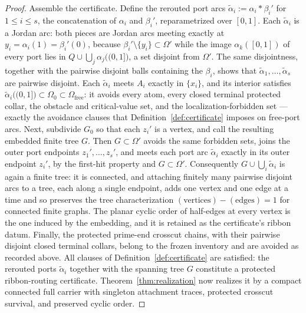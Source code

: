 \documentclass[11pt,reqno]{amsart}
\theoremstyle{definition}
\theoremstyle{remark}
\newcommand{\Omfree}{\Omega_{\mathrm{free}}}
\begin{document}
\begin{proof}
Assemble the certificate. Define the rerouted port arcs
$\tilde\alpha_i:=\alpha_i*\beta_i'$ for $1\le i\le s$, the concatenation of $\alpha_i$
and $\beta_i'$, reparametrized over $[0,1]$. Each $\tilde\alpha_i$ is a Jordan arc: both
pieces are Jordan arcs meeting exactly at $y_i=\alpha_i(1)=\beta_i'(0)$, because
$\beta_i'\setminus\{y_i\}\subset\Omega'$ while the image
$\alpha_k([0,1])$ of every port lies in
$Q\cup\bigcup_j\alpha_j\bigl((0,1]\bigr)$, a set disjoint from $\Omega'$. The same
disjointness, together with the pairwise disjoint balls containing the $\beta_i$, shows
that $\tilde\alpha_1,\dots,\tilde\alpha_s$ are pairwise disjoint. Each $\tilde\alpha_i$
meets $A_i$ exactly in $\{x_i\}$, and its interior satisfies
$\tilde\alpha_i\bigl((0,1]\bigr)\subset\Omega_0\subset\Omfree$: it avoids every atom,
every closed terminal protected collar, the obstacle and critical-value set, and the
localization-forbidden set --- exactly the avoidance clauses that
Definition~\ref{def:certificate} imposes on free-port arcs. Next, subdivide $G_0$ so
that each $z_i'$ is a vertex, and call the resulting embedded finite tree $G$. Then
$G\subset\Omega'$ avoids the same forbidden sets, joins the outer port endpoints
$z_1',\dots,z_s'$, and meets each port arc $\tilde\alpha_i$ exactly in its outer
endpoint $z_i'$, by the first-hit property and $G\subset\Omega'$. Consequently
$G\cup\bigcup_i\tilde\alpha_i$ is again a finite tree: it is connected, and attaching
finitely many pairwise disjoint arcs to a tree, each along a single endpoint, adds one
vertex and one edge at a time and so preserves the tree characterization
$(\text{vertices})-(\text{edges})=1$ for connected finite graphs. The planar cyclic
order of half-edges at every vertex is the one induced by the embedding, and it is
retained as the certificate's ribbon datum. Finally, the protected prime-end crosscut
chains, with their pairwise disjoint closed terminal collars, belong to the frozen
inventory and are avoided as recorded above. All clauses of
Definition~\ref{def:certificate} are satisfied: the rerouted ports $\tilde\alpha_i$
together with the spanning tree $G$ constitute a protected ribbon-routing certificate.
Theorem~\ref{thm:realization} now realizes it by a compact connected full carrier with
singleton attachment traces, protected crosscut survival, and preserved cyclic order.


\end{proof}
\end{document}
